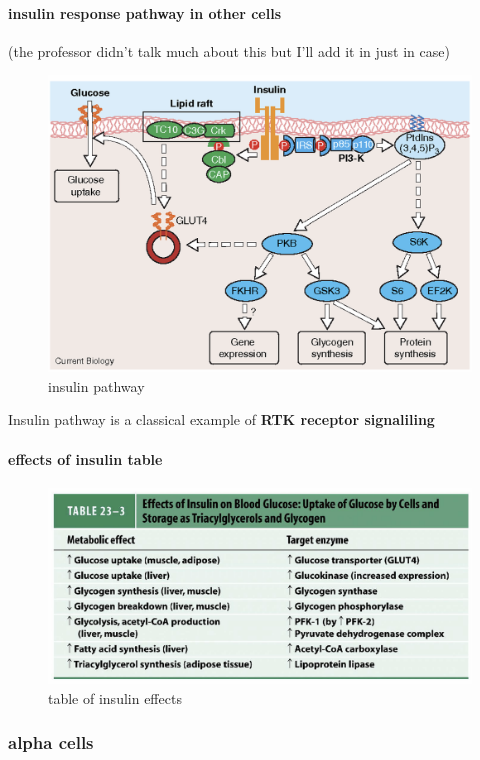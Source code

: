 \documentclass[../main.tex]{subfiles}
\begin{document}
\paragraph{insulin response pathway in other cells}
(the professor didn't talk much about this but I'll add it in just in case)
\begin{figure}[H]
    \centering
    \includegraphics[width=0.7\linewidth]{insulinPathway.png}
    \caption{insulin pathway}
    \label{fig:enter-label}
\end{figure}
Insulin pathway is a classical example of\textbf{ RTK receptor signaliling}
\paragraph{effects of insulin table}
\begin{figure}[H]
    \centering
    \includegraphics[width=\linewidth]{insulinTable.png}
    \caption{table of insulin effects}
    \label{fig:enter-label}
\end{figure}

\subsubsection{alpha cells}
\end{document}
